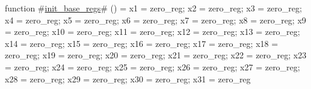function #\hyperref[sailRISCVzinitzybasezyregs]{init\_base\_regs}# () = {
  x1  = zero_reg;
  x2  = zero_reg;
  x3  = zero_reg;
  x4  = zero_reg;
  x5  = zero_reg;
  x6  = zero_reg;
  x7  = zero_reg;
  x8  = zero_reg;
  x9  = zero_reg;
  x10 = zero_reg;
  x11 = zero_reg;
  x12 = zero_reg;
  x13 = zero_reg;
  x14 = zero_reg;
  x15 = zero_reg;
  x16 = zero_reg;
  x17 = zero_reg;
  x18 = zero_reg;
  x19 = zero_reg;
  x20 = zero_reg;
  x21 = zero_reg;
  x22 = zero_reg;
  x23 = zero_reg;
  x24 = zero_reg;
  x25 = zero_reg;
  x26 = zero_reg;
  x27 = zero_reg;
  x28 = zero_reg;
  x29 = zero_reg;
  x30 = zero_reg;
  x31 = zero_reg
}

